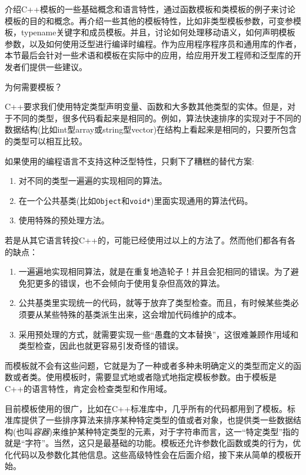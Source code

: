

介绍C++模板的一些基础概念和语言特性，通过函数模板和类模板的例子来讨论模板的目的和概念。再介绍一些其他的模板特性，比如非类型模板参数，可变参模板，typename关键字和成员模板。并且，讨论如何处理移动语义，如何声明模板参数，以及如何使用泛型进行编译时编程。作为应用程序程序员和通用库的作者，本节最后会针对一些术语和模板在实际中的应用，给应用开发工程师和泛型库的开发者们提供一些建议。

\begin{flushleft}
 为何需要模板？
\end{flushleft}

C++要求我们使用特定类型声明变量、函数和大多数其他类型的实体。但是，对于不同的类型，很多代码看起来是相同的。例如，算法快速排序的实现对于不同的数据结构(比如int型array或string型vector)在结构上看起来是相同的，只要所包含的类型可以相互比较。

如果使用的编程语言不支持这种泛型特性，只剩下了糟糕的替代方案:

\begin{enumerate}
\item 
对不同的类型一遍遍的实现相同的算法。

\item 
在一个公共基类(比如\texttt{Object}和\texttt{void*})里面实现通用的算法代码。

\item 
使用特殊的预处理方法。
\end{enumerate}

若是从其它语言转投C++的，可能已经使用过以上的方法了。然而他们都各有各的缺点：

\begin{enumerate}
\item 
一遍遍地实现相同算法，就是在重复地造轮子！并且会犯相同的错误。为了避免犯更多的错误，也不会倾向于使用复杂但高效的算法。

\item 
公共基类里实现统一的代码，就等于放弃了类型检查。而且，有时候某些类必须要从某些特殊的基类派生出来，这会增加代码维护的成本。

\item 
采用预处理的方式，就需要实现一些“愚蠢的文本替换”，这很难兼顾作用域和类型检查，因此也就更容易引发奇怪的错误。
\end{enumerate}

而模板就不会有这些问题，它就是为了一种或者多种未明确定义的类型而定义的函数或者类。使用模板时，需要显式地或者隐式地指定模板参数。由于模板是C++的语言特性，肯定会检查类型和作用域。

目前模板使用的很广，比如在C++标准库中，几乎所有的代码都用到了模板。标准库提供了一些排序算法来排序某种特定类型的值或者对象，也提供类一些数据结构(也叫\textit{容器})来维护某种特定类型的元素，对于字符串而言，这一“特定类型”指的就是“字符”。当然，这只是最基础的功能。模板还允许参数化函数或类的行为，优化代码以及参数化其他信息。这些高级特性会在后面介绍，接下来从简单的模板开始。










